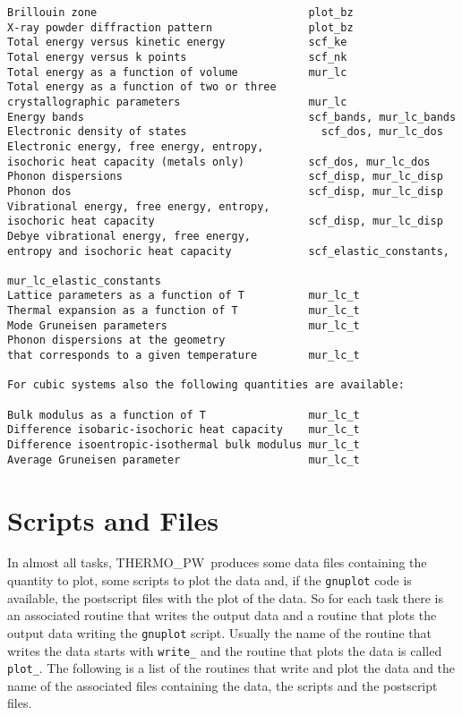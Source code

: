 \documentclass[12pt,a4paper]{article}
\def\tpw{{\sc THERMO\_PW}}
\begin{document}
\begin{verbatim}
Brillouin zone                                 plot_bz
X-ray powder diffraction pattern               plot_bz
Total energy versus kinetic energy             scf_ke
Total energy versus k points                   scf_nk
Total energy as a function of volume           mur_lc
Total energy as a function of two or three
crystallographic parameters                    mur_lc
Energy bands                                   scf_bands, mur_lc_bands
Electronic density of states                     scf_dos, mur_lc_dos
Electronic energy, free energy, entropy,      
isochoric heat capacity (metals only)          scf_dos, mur_lc_dos
Phonon dispersions                             scf_disp, mur_lc_disp
Phonon dos                                     scf_disp, mur_lc_disp
Vibrational energy, free energy, entropy,      
isochoric heat capacity                        scf_disp, mur_lc_disp
Debye vibrational energy, free energy, 
entropy and isochoric heat capacity            scf_elastic_constants, 
                                               mur_lc_elastic_constants
Lattice parameters as a function of T          mur_lc_t
Thermal expansion as a function of T           mur_lc_t 
Mode Gruneisen parameters                      mur_lc_t
Phonon dispersions at the geometry 
that corresponds to a given temperature        mur_lc_t

For cubic systems also the following quantities are available:

Bulk modulus as a function of T                mur_lc_t
Difference isobaric-isochoric heat capacity    mur_lc_t
Difference isoentropic-isothermal bulk modulus mur_lc_t
Average Gruneisen parameter                    mur_lc_t

\end{verbatim}

\newpage
\section{\color{coral}Scripts and Files}

In almost all tasks, \tpw\ produces some data files containing the quantity 
to plot, some scripts to plot the data and, if the \texttt{gnuplot} code
is available, the postscript files with the plot of the data. So for each 
task there is an associated routine
that writes the output data and a routine that plots the output data
writing the \texttt{gnuplot} script. Usually the name of the routine that
writes the data starts with \texttt{write\_} and the routine that plots
the data is called \texttt{plot\_}. The following is a list of the routines
that write and plot the data and the name of the associated files
containing the data, the scripts and the postscript files.
\end{document}
